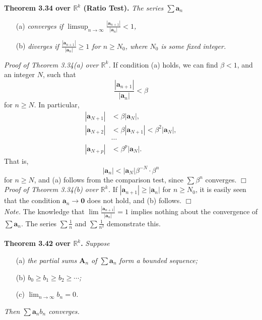 \documentclass{article}
\begin{document}
\textbf{Theorem 3.34 over $\mathbb{R}^k$ (Ratio Test).}
\emph{The series $\sum \mathbf{a}_n$}
\begin{enumerate}
\item[(a)]
\emph{converges if
$\limsup_{n \to \infty} \frac{|\mathbf{a}_{n+1}|}{|\mathbf{a}_n|} < 1$,}
\item[(b)]
\emph{diverges if
$\frac{|\mathbf{a}_{n+1}|}{|\mathbf{a}_n|} \geq 1$ for $n \geq N_0$,
where $N_0$ is some fixed integer.} \\
\end{enumerate}

\emph{Proof of Theorem 3.34(a) over $\mathbb{R}^k$.}
If condition (a) holds, we can find $\beta < 1$, and an integer $N$,
such that
\[
  \frac{|\mathbf{a}_{n+1}|}{|\mathbf{a}_n|} < \beta
\]
for $n \geq N$. In particular,
\begin{align*}
  |\mathbf{a}_{N+1}| &< \beta|\mathbf{a}_{N}|, \\
  |\mathbf{a}_{N+2}| &< \beta|\mathbf{a}_{N+1}| < \beta^2 |\mathbf{a}_{N}|, \\
  &\cdots \\
  |\mathbf{a}_{N+p}| &< \beta^p |\mathbf{a}_{N}|.
\end{align*}
That is,
\[
  |\mathbf{a}_{n}| < |\mathbf{a}_{N}|\beta^{-N} \cdot \beta^n
\]
for $n \geq N$, and (a) follows from the comparison test,
since $\sum \beta^n$ converges.
$\Box$ \\

\emph{Proof of Theorem 3.34(b) over $\mathbb{R}^k$.}
If $|\mathbf{a}_{n+1}| \geq |\mathbf{a}_n|$ for $n \geq N_0$,
it is easily seen that the condition $\mathbf{a}_n \to \mathbf{0}$
does not hold, and (b) follows.
$\Box$ \\

\emph{Note.}
The knowledge that $\lim \frac{|\mathbf{a}_{n+1}|}{|\mathbf{a}_n|} = 1$
implies nothing about the convergence of $\sum \mathbf{a}_n$.
The series $\sum \frac{1}{n}$ and $\sum \frac{1}{n^2}$ demonstrate this. \\\\



\textbf{Theorem 3.42 over $\mathbb{R}^k$.}
\emph{Suppose}
\begin{enumerate}
\item[(a)]
\emph{the partial sums $\mathbf{A}_n$ of $\sum \mathbf{a}_n$ form a bounded sequence;}
\item[(b)]
\emph{$b_0 \geq b_1 \geq b_2 \geq \cdots$;}
\item[(c)]
\emph{$\lim_{n \to \infty} b_n = 0$.}
\end{enumerate}
\emph{Then $\sum \mathbf{a}_n b_n$ converges.} \\
\end{document}

